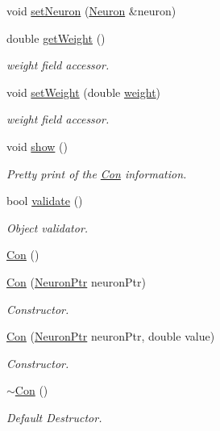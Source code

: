 \begin{DoxyCompactItemize}
void \hyperlink{class_con_ae372f50a253a424376959fb6ee8f083b}{setNeuron} (\hyperlink{class_neuron}{Neuron} \&neuron)
\item 
double \hyperlink{class_con_a385c5bf6eb9e2ffc94c5b427c287ccb2}{getWeight} ()
\begin{DoxyCompactList}\small\item\em weight field accessor. \end{DoxyCompactList}\item 
void \hyperlink{class_con_acf3b130556e25414cd525d469b275239}{setWeight} (double \hyperlink{class_con_a7f46485ba5b41971ea38641f9e7d1be0}{weight})
\begin{DoxyCompactList}\small\item\em weight field accessor. \end{DoxyCompactList}\item 
void \hyperlink{class_con_ab85838575b5e01f3b8073136f2102922}{show} ()
\begin{DoxyCompactList}\small\item\em Pretty print of the \hyperlink{class_con}{Con} information. \end{DoxyCompactList}\item 
bool \hyperlink{class_con_af5f836a7b0988b3d9113589b2959d5e6}{validate} ()
\begin{DoxyCompactList}\small\item\em Object validator. \end{DoxyCompactList}\item 
\hyperlink{class_con_a61621054cc1ee979385c81207ee0bceb}{Con} ()
\item 
\hyperlink{class_con_a9cebcd0e50b00f70e962997a8343cbb5}{Con} (\hyperlink{_a_m_o_r_e_8h_ac1ea936c2c7728eb382278131652fef4}{NeuronPtr} neuronPtr)
\begin{DoxyCompactList}\small\item\em Constructor. \end{DoxyCompactList}\item 
\hyperlink{class_con_a24c0cd2e7eea23c3a0c9435c6a238a14}{Con} (\hyperlink{_a_m_o_r_e_8h_ac1ea936c2c7728eb382278131652fef4}{NeuronPtr} neuronPtr, double value)
\begin{DoxyCompactList}\small\item\em Constructor. \end{DoxyCompactList}\item 
\hyperlink{class_con_a703b044611253c7a0a9e057ed62a3d22}{$\sim$Con} ()
\begin{DoxyCompactList}\small\item\em Default Destructor. \end{DoxyCompactList}\item 

\end{DoxyCompactItemize}
